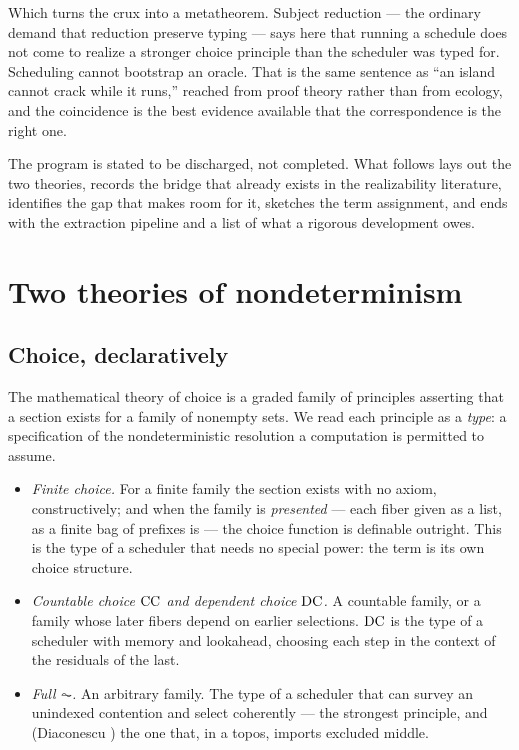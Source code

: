 Which turns the crux into a metatheorem. Subject reduction --- the ordinary demand that
reduction preserve typing --- says here that running a schedule does not come to realize
a stronger choice principle than the scheduler was typed for. Scheduling cannot
bootstrap an oracle. That is the same sentence as ``an island cannot crack while it
runs,'' reached from proof theory rather than from ecology, and the coincidence is the
best evidence available that the correspondence is the right one.

The program is stated to be discharged, not completed. What follows lays out the two
theories, records the bridge that already exists in the realizability literature,
identifies the gap that makes room for it, sketches the term assignment, and ends with
the extraction pipeline and a list of what a rigorous development owes.

\bigskip
\section{Two theories of nondeterminism}\label{chs:sec:two}

\subsection{Choice, declaratively}

The mathematical theory of choice is a graded family of principles asserting that a section
exists for a family of nonempty sets. We read each principle as a \emph{type}: a specification
of the nondeterministic resolution a computation is permitted to assume.

\begin{itemize}[leftmargin=1.4em]
\item \emph{Finite choice.} For a finite family the section exists with no axiom, constructively;
and when the family is \emph{presented} --- each fiber given as a list, as a finite bag of
prefixes is --- the choice function is definable outright. This is the type of a scheduler that
needs no special power: the term is its own choice structure.
\item \emph{Countable choice $\mathrm{CC}$ and dependent choice $\mathrm{DC}$.} A countable family, or a family
whose later fibers depend on earlier selections. $\mathrm{DC}$ is the type of a scheduler with memory and
lookahead, choosing each step in the context of the residuals of the last.
\item \emph{Full $\AC$.} An arbitrary family. The type of a scheduler that can survey an
unindexed contention and select coherently --- the strongest principle, and (Diaconescu
\cite{diaconescu}) the one that, in a topos, imports excluded middle.
\end{itemize}

